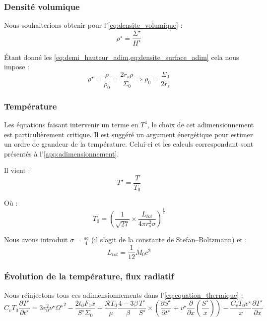 \subsubsection{Densité volumique}

Nous souhaiterions obtenir pour l’\cref{eq:densite_volumique} :
\begin{equation}
    \rho^\star = \frac{\Sigma^\star}{H^\star}
\end{equation}

Étant donné les \cref{eq:demi_hauteur_adim,eq:densite_surface_adim} cela nous
impose :
\begin{equation}
    \rho^\star = \frac{\rho}{\rho_0} = \frac{2 r_s \rho}{\Sigma_0} \Rightarrow \rho_0 = \frac{\Sigma_0}{2 r_s}
\end{equation}

\subsubsection{Température}

Les équations faisant intervenir un terme en $T^4$, le choix de cet
adimensionnement est particulièrement critique. Il est suggéré un argument
énergétique pour estimer un ordre de grandeur de la température. Celui-ci et
les calculs correspondant sont présentés à l’\cref{app:adimensionnement}. 

Il vient :
\begin{equation}
    T^{\star} = \frac{T}{T_0}
\end{equation}

Où :
\begin{equation}
    T_0 = \left(\frac{1}{\sqrt{27}} \times \frac{L_{tot}}{4 \pi r_s^2 \sigma} \right)^\frac{1}{4}
\end{equation}

Nous avons introduit $\sigma = \frac{a c}{4}$ (il s’agit de la constante de
Stefan–Boltzmann) et :
\begin{equation}
    L_{tot} = \frac{1}{12} \dot{M_0} c^2
\end{equation}

\subsubsection{Évolution de la température, flux radiatif}

Nous réinjectons tous ces adimensionnements dans l’\cref{eq:equation_thermique} :
\begin{equation}
    C_v T_0 \frac{\partial T^{\star}}{\partial t^{\star}} =
    3 v_0^2 \nu^\star {\Omega^\star}^2 - \frac{2 t_0 F_z x}{S^\star \Sigma_0} +
    \frac{\mathcal{R} T_0}{\mu} \frac{4-3\beta}{\beta} \frac{T^\star}{S^\star} \times
    \left( \frac{\partial S^\star}{\partial t^\star} + v^\star \frac{\partial}{\partial x} \left(\frac{S^\star}{x}\right) \right) -
    \frac{C_v T_0 v^\star}{x} \frac{\partial T^\star}{\partial x}
\end{equation}

